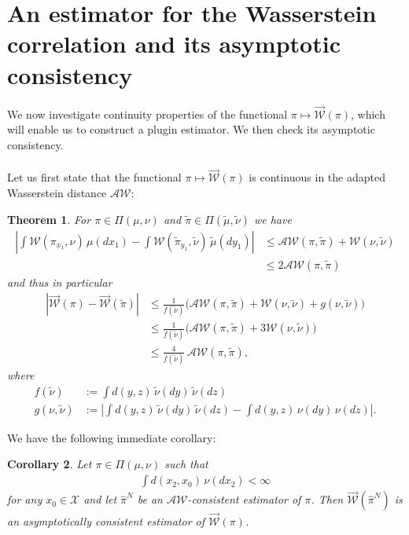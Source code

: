 \documentclass[10pt]{amsart}
\newtheorem{theorem}{Theorem}[section]
\newtheorem{corollary}[theorem]{Corollary}
\begin{document}
\section{An estimator for the Wasserstein correlation and its asymptotic consistency}\label{sec:3}

We now investigate continuity properties of the functional $\pi\mapsto \overrightarrow{\mathcal{W}}(\pi)$, which will enable us to construct a plugin estimator. We then check its asymptotic consistency.\\\\
Let us first state that the functional $\pi\mapsto \overrightarrow{\mathcal{W}}(\pi)$ is continuous in the adapted Wasserstein distance $\mathcal{AW}$:

\begin{theorem}\label{thm:triangle}
For $\pi\in \Pi(\mu,\nu)$ and $\tilde{\pi}\in \Pi(\tilde{\mu},\tilde{\nu})$ we have 
\begin{align*}
\left| \int \mathcal{W}(\pi_{x_1}, \nu)\,\mu(dx_1) - \int \mathcal{W}(\tilde{\pi}_{y_1}, \tilde{\nu})\,\tilde{\mu}(dy_1) \right|&\le  \mathcal{AW}(\pi, \tilde{\pi})+\mathcal{W}(\nu,\tilde{\nu})\\
&\le 2 \mathcal{AW}(\pi, \tilde{\pi}) 
\end{align*}
and thus in particular
\begin{align*}
\left| \overrightarrow{\mathcal{W}}(\pi)-\overrightarrow{\mathcal{W}}(\tilde{\pi}) \right|&\le \frac{1}{f(\tilde{\nu})}\Big(\mathcal{AW}(\pi,\tilde{\pi})+\mathcal{W}(\nu,\tilde{\nu})+ g(\nu,\tilde{\nu}) \Big)\\
&\le \frac{1 }{f(\tilde{\nu})}\Big(\mathcal{AW}(\pi,\tilde{\pi})+3\mathcal{W}(\nu,\tilde{\nu}) \Big)\\
&\le \frac{4 }{f(\tilde{\nu})}\, \mathcal{AW}(\pi,\tilde{\pi}),
\end{align*}
where
\begin{align*}
f(\tilde{\nu})&:= \int  d(y,z)\,\tilde{\nu}(dy)\,\tilde{\nu}(dz) \\
g(\nu, \tilde{\nu})&:=\left|\int  d(y,z)\,\tilde{\nu}(dy)\,\tilde{\nu}(dz) - \int  d(y,z)\,\nu(dy)\,\nu(dz)  \right|.
\end{align*}
\end{theorem}


We have the following immediate corollary:

\begin{corollary}\label{cor:consistency}
Let $\pi \in \Pi(\mu,\nu)$ such that 
\begin{align*}
\int d(x_2,x_0)\,\nu(dx_2) <\infty
\end{align*}
for any $x_0\in \mathcal{X}$ and let $\hat{\pi}^N$ be an $\mathcal{AW}$-consistent estimator of $\pi$. Then $\overrightarrow{\mathcal{W}}(\hat{\pi}^N)$ is an asymptotically consistent estimator of $\overrightarrow{\mathcal{W}}(\pi)$.
\end{corollary}
\end{document}
